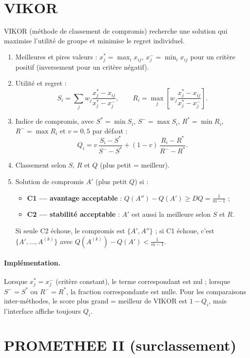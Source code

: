 \documentclass[11pt,a4paper]{report}
\theoremstyle{definition}
\theoremstyle{remark}
\begin{document}
\section{VIKOR}

VIKOR (méthode de classement de compromis) recherche une solution qui maximise l'utilité de groupe et
minimise le regret individuel.
\begin{enumerate}
  \item Meilleures et pires valeurs : $x_j^*=\max_i x_{ij}$, $x_j^-=\min_i x_{ij}$ pour un critère positif
        (inversement pour un critère négatif).
  \item Utilité et regret :
  \begin{equation}
    S_i=\sum_j w_j\frac{x_j^*-x_{ij}}{x_j^*-x_j^-},\qquad
    R_i=\max_j\left[w_j\frac{x_j^*-x_{ij}}{x_j^*-x_j^-}\right].
  \end{equation}
  \item Indice de compromis, avec $S^*=\min S_i$, $S^-=\max S_i$, $R^*=\min R_i$, $R^-=\max R_i$ et
        $v=0{,}5$ par défaut :
  \begin{equation}
    Q_i=v\,\frac{S_i-S^*}{S^--S^*}+(1-v)\,\frac{R_i-R^*}{R^--R^*}.
  \end{equation}
  \item Classement selon $S$, $R$ et $Q$ (plus petit = meilleur).
  \item Solution de compromis $A'$ (plus petit $Q$) si :
  \begin{itemize}
    \item \textbf{C1 --- avantage acceptable} : $Q(A'')-Q(A')\ge DQ=\frac{1}{m-1}$ ;
    \item \textbf{C2 --- stabilité acceptable} : $A'$ est aussi la meilleure selon $S$ et $R$.
  \end{itemize}
  Si seule C2 échoue, le compromis est $\{A',A''\}$ ; si C1 échoue, c'est
  $\{A',\dots,A^{(k)}\}$ avec $Q(A^{(k)})-Q(A')<\frac{1}{m-1}$.
\end{enumerate}

\paragraph{Implémentation.} Lorsque $x_j^*=x_j^-$ (critère constant), le terme correspondant est nul ;
lorsque $S^-=S^*$ ou $R^-=R^*$, la fraction correspondante est nulle. Pour les comparaisons inter-méthodes,
le score \og plus grand = meilleur \fg{} de VIKOR est $1-Q_i$, mais l'interface affiche toujours $Q_i$.

\section{PROMETHEE II (surclassement)}
\end{document}
